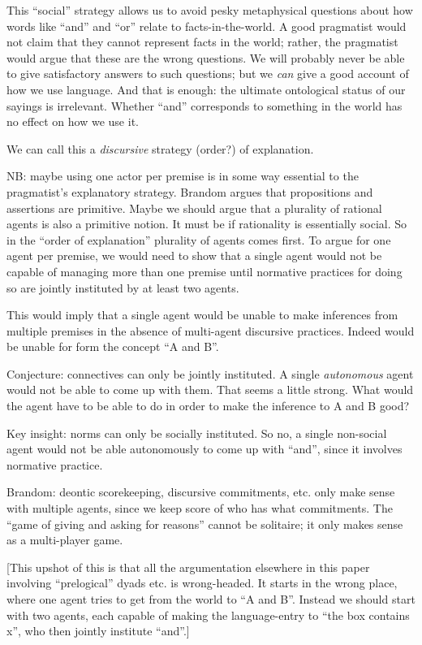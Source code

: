 \documentclass{article}
\begin{document}
This ``social'' strategy allows us to avoid pesky metaphysical
questions about how words like ``and'' and ``or'' relate to
facts-in-the-world. A good pragmatist would not claim that they cannot
represent facts in the world; rather, the pragmatist would argue that
these are the wrong questions. We will probably never be able to give
satisfactory answers to such questions; but we \textit{can} give a
good account of how we use language. And that is enough: the ultimate
ontological status of our sayings is irrelevant. Whether ``and''
corresponds to something in the world has no effect on how we use it.

We can call this a \textit{discursive} strategy (order?) of explanation.

NB: maybe using one actor per premise is in some way essential to the
pragmatist's explanatory strategy. Brandom argues that propositions
and assertions are primitive. Maybe we should argue that a plurality
of rational agents is also a primitive notion. It must be if
rationality is essentially social. So in the ``order of explanation''
plurality of agents comes first. To argue for one agent per premise,
we would need to show that a single agent would not be capable of
managing more than one premise until normative practices for doing so
are jointly instituted by at least two agents.

This would imply that a single agent would be unable to make
inferences from multiple premises in the absence of multi-agent
discursive practices. Indeed would be unable for form the concept ``A
and B''.

Conjecture: connectives can only be jointly instituted. A single
\textit{autonomous} agent would not be able to come up with them. That
seems a little strong. What would the agent have to be able to do in
order to make the inference to A and B good?

Key insight: norms can only be socially instituted. So no, a single
non-social agent would not be able autonomously to come up with
``and'', since it involves normative practice.

Brandom: deontic scorekeeping, discursive commitments, etc. only make
sense with multiple agents, since we keep score of who has what
commitments. The ``game of giving and asking for reasons'' cannot be
solitaire; it only makes sense as a multi-player game.

[This upshot of this is that all the argumentation elsewhere in this
  paper involving ``prelogical'' dyads etc. is wrong-headed. It starts
  in the wrong place, where one agent tries to get from the world to
  ``A and B''. Instead we should start with two agents, each capable
  of making the language-entry to ``the box contains x'', who then
  jointly institute ``and''.]
\end{document}

